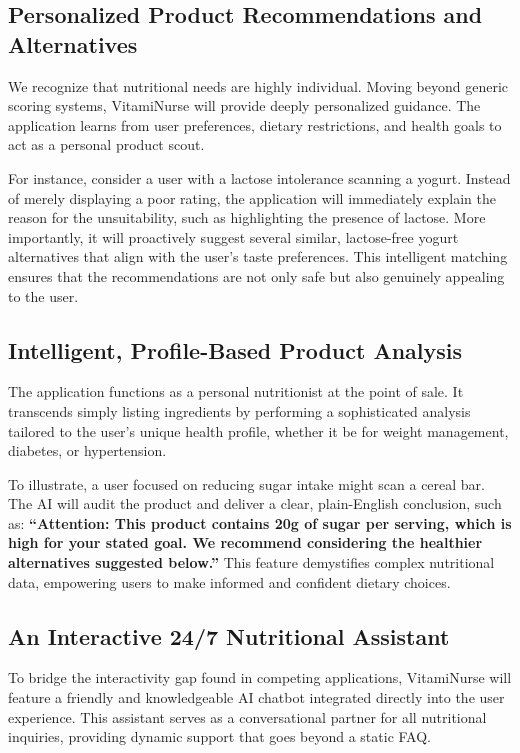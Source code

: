 \subsection{Personalized Product Recommendations and Alternatives}

We recognize that nutritional needs are highly individual. Moving beyond generic scoring systems, VitamiNurse will provide deeply personalized guidance. The application learns from user preferences, dietary restrictions, and health goals to act as a personal product scout.

For instance, consider a user with a lactose intolerance scanning a yogurt. Instead of merely displaying a poor rating, the application will immediately explain the reason for the unsuitability, such as highlighting the presence of lactose. More importantly, it will proactively suggest several similar, lactose-free yogurt alternatives that align with the user's taste preferences. This intelligent matching ensures that the recommendations are not only safe but also genuinely appealing to the user.

\subsection{Intelligent, Profile-Based Product Analysis}

The application functions as a personal nutritionist at the point of sale. It transcends simply listing ingredients by performing a sophisticated analysis tailored to the user's unique health profile, whether it be for weight management, diabetes, or hypertension.

To illustrate, a user focused on reducing sugar intake might scan a cereal bar. The AI will audit the product and deliver a clear, plain-English conclusion, such as: \textbf{“Attention: This product contains 20g of sugar per serving, which is high for your stated goal. We recommend considering the healthier alternatives suggested below.”} This feature demystifies complex nutritional data, empowering users to make informed and confident dietary choices.

\subsection{An Interactive 24/7 Nutritional Assistant}

To bridge the interactivity gap found in competing applications, VitamiNurse will feature a friendly and knowledgeable AI chatbot integrated directly into the user experience. This assistant serves as a conversational partner for all nutritional inquiries, providing dynamic support that goes beyond a static FAQ.

